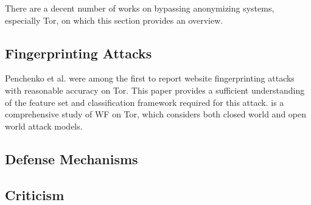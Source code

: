 
There are a decent number of works on bypassing anonymizing systems, especially Tor, on which this section provides an overview.

\subsection{Fingerprinting Attacks}
Penchenko et al. \cite{panchenko11} were among the first to report website fingerprinting attacks with reasonable accuracy on Tor. This paper provides a sufficient understanding of the feature set and classification framework required for this attack. \cite{panchenko11} is a comprehensive study of WF on Tor, which considers both closed world and open world attack models. 

\subsection{Defense Mechanisms}


\subsection{Criticism}

